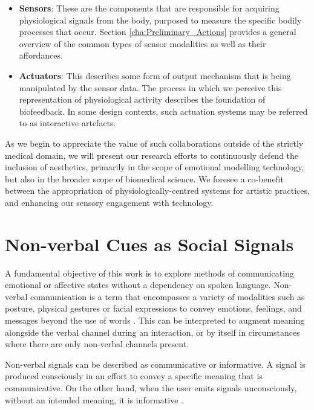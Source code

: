 \begin{itemize}
    \item \textbf{Sensors}: These are the components that are responsible for acquiring physiological signals from the body, purposed to measure the specific bodily processes that occur. Section \ref{cha:Preliminary_Actions} provides a general overview of the common types of sensor modalities as well as their affordances.
    \item \textbf{Actuators}: This describes some form of output mechanism that is being manipulated by the sensor data. The process in which we perceive this representation of physiological activity describes the foundation of biofeedback. In some design contexts, such actuation systems may be referred to as interactive artefacts.
\end{itemize}

As we begin to appreciate the value of such collaborations outside of the strictly medical domain, we will present our research efforts to continuously defend the inclusion of aesthetics, primarily in the scope of emotional modelling technology, but also in the broader scope of biomedical science. We foresee a co-benefit between the appropriation of physiologically-centred systems for artistic practices, and enhancing our sensory engagement with technology.


\section{Non-verbal Cues as Social Signals}

A fundamental objective of this work is to explore methods of communicating emotional or affective states without a dependency on spoken language. Non-verbal communication is a term that encompasses a variety of modalities such as posture, physical gestures or facial expressions to convey emotions, feelings, and messages beyond the use of words \cite{knapp_nonverbal_2009, richmond_nonverbal_2011}. This can be interpreted to augment meaning alongside the verbal channel during an interaction, or by itself in circumstances where there are only non-verbal channels present.

Non-verbal signals can be described as communicative or informative. A signal is produced consciously in an effort to convey a specific meaning that is communicative. On the other hand, when the user emits signals unconsciously, without an intended meaning, it is informative \cite{vinciarelli_towards_2011}. 

